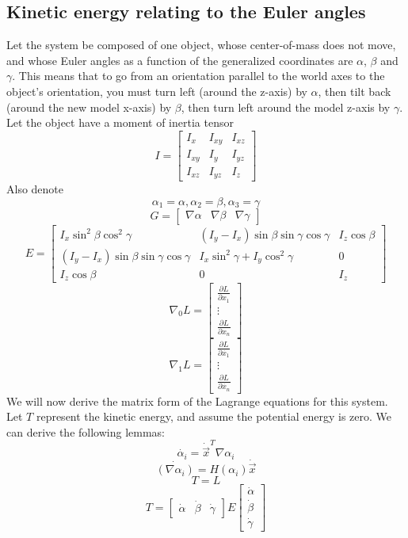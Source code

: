 \documentclass{article}
\begin{document}
\subsection{Kinetic energy relating to the Euler angles}
Let the system be composed of one object, whose center-of-mass does not move, and whose Euler angles as a function of the generalized coordinates are \(\alpha\), \(\beta\) and \(\gamma\).
This means that to go from an orientation parallel to the world axes to the object's orientation, you must turn left (around the z-axis) by \(\alpha\), then tilt back (around the new model x-axis) by \(\beta\), then turn left around the model z-axis by \(\gamma\).
Let the object have a moment of inertia tensor
\[
I = \begin{bmatrix}
I_x & I_{xy} & I_{xz} \\
I_{xy} & I_y & I_{yz} \\
I_{xz} & I_{yz} & I_z
\end{bmatrix}
\]
Also denote
\[
\alpha_1 = \alpha, \alpha_2 = \beta, \alpha_3 = \gamma
\]\[
G = \begin{bmatrix}
\nabla \alpha & \nabla \beta & \nabla \gamma
\end{bmatrix}
\]
\[
E = \begin{bmatrix}
I_x \sin^2 \beta \cos^2 \gamma & (I_y-I_x)\sin\beta\sin\gamma\cos\gamma & I_z\cos\beta \\
(I_y-I_x)\sin\beta\sin\gamma\cos\gamma & I_x\sin^2\gamma+I_y\cos^2\gamma & 0 \\
I_z\cos\beta & 0 & I_z
\end{bmatrix}
\]\[
\nabla_0 L = \begin{bmatrix} \frac{\partial L}{\partial x_1} \\ \vdots \\ \frac{\partial L}{\partial x_n} \end{bmatrix}
\]\[
\nabla_1 L = \begin{bmatrix} \frac{\partial L}{\partial \dot{x_1}} \\ \vdots \\ \frac{\partial L}{\partial \dot{x_n}} \end{bmatrix}
\]
We will now derive the matrix form of the Lagrange equations for this system.
Let \(T\) represent the kinetic energy, and assume the potential energy is zero.
We can derive the following lemmas:
\[
\dot{\alpha_i} = \dot{\overrightarrow{x}}^T \nabla\alpha_i
\]\[
\dot{(\nabla\alpha_i)} = H(\alpha_i)\dot{\overrightarrow{x}}
\]\[
T = L
\]
\[
T = \begin{bmatrix}\dot \alpha & \dot \beta & \dot \gamma \end{bmatrix}
E \begin{bmatrix}\dot \alpha \\ \dot \beta \\ \dot \gamma \end{bmatrix}
\]
\end{document}
